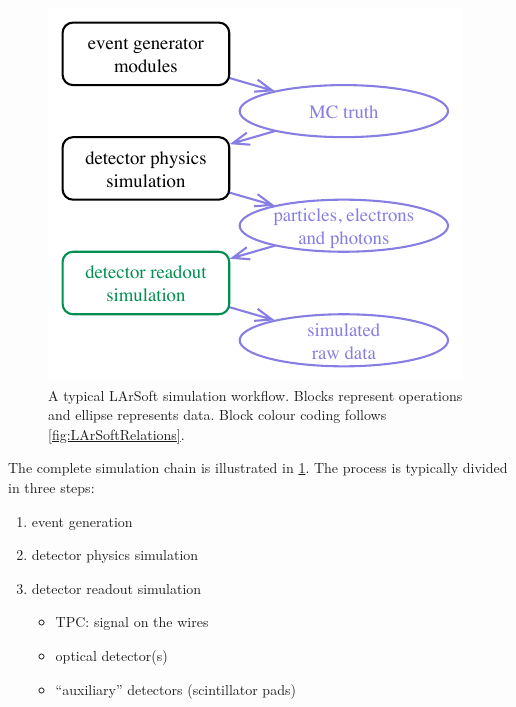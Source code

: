 \begin{figure}
   \centering
   \includegraphics{figures/LArSoftSimulationWorkflow}
   \caption{\label{fig:LArSoftSimulationWorkflow}
      A typical LArSoft simulation workflow.
      Blocks represent operations and ellipse represents data.
      Block colour coding follows \cref{fig:LArSoftRelations}.
   }
\end{figure}
The complete simulation chain is illustrated in \cref{fig:LArSoftSimulationWorkflow}.
The process is typically divided in three steps:
\begin{enumerate}
   \item event generation
   \item detector physics simulation
   \item detector readout simulation
      \begin{itemize}
         \item TPC: signal on the wires
         \item optical detector(s)
         \item ``auxiliary'' detectors (\eg scintillator pads)
      \end{itemize}
\end{enumerate}

